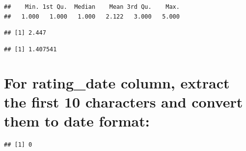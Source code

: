 \documentclass[
]{article}
\newenvironment{Shaded}{\begin{snugshade}}{\end{snugshade}}
\newcommand{\CommentTok}[1]{\textcolor[rgb]{0.56,0.35,0.01}{\textit{#1}}}
\newcommand{\FunctionTok}[1]{\textcolor[rgb]{0.13,0.29,0.53}{\textbf{#1}}}
\newcommand{\NormalTok}[1]{#1}
\newcommand{\SpecialCharTok}[1]{\textcolor[rgb]{0.81,0.36,0.00}{\textbf{#1}}}
\begin{document}
\begin{Shaded}
\end{Shaded}

\begin{verbatim}
##    Min. 1st Qu.  Median    Mean 3rd Qu.    Max. 
##   1.000   1.000   1.000   2.122   3.000   5.000
\end{verbatim}

\begin{Shaded}
\end{Shaded}

\begin{verbatim}
## [1] 2.447
\end{verbatim}

\begin{Shaded}
\end{Shaded}

\begin{verbatim}
## [1] 1.407541
\end{verbatim}

\section{For rating\_date column, extract the first 10 characters and
convert them to date
format:}\label{for-rating_date-column-extract-the-first-10-characters-and-convert-them-to-date-format}

\begin{Shaded}
\end{Shaded}

\begin{verbatim}
## [1] 0
\end{verbatim}
\end{document}
